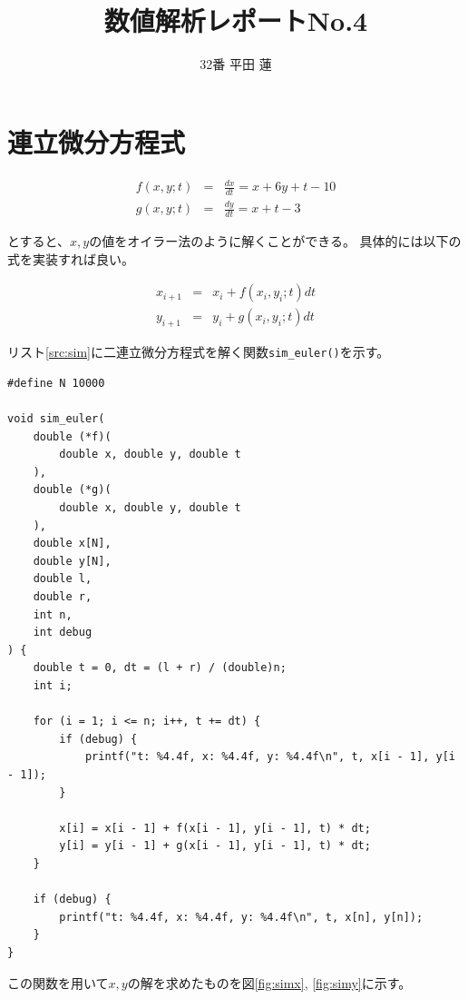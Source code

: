 \documentclass{jsarticle}
\title{数値解析レポートNo.4}
\author{32番 平田 蓮}
\date{}
\begin{document}
\maketitle
    \section{連立微分方程式}
        \begin{eqnarray}
            f(x, y; t) &=& \frac{dx}{dt} = x + 6y + t - 10 \nonumber \\
            g(x, y; t) &=& \frac{dy}{dt} = x + t - 3 \nonumber
        \end{eqnarray}

        とすると、$x, y$の値をオイラー法のように解くことができる。
        具体的には以下の式を実装すれば良い。

        \begin{eqnarray}
            x_{i + 1} &=& x_i + f(x_i, y_i; t)dt \nonumber \\
            y_{i + 1} &=& y_i + g(x_i, y_i; t)dt \nonumber
        \end{eqnarray}

        リスト\ref{src:sim}に二連立微分方程式を解く関数\verb|sim_euler()|を示す。

        \begin{lstlisting}[caption=sim\_euler.c, label=src:sim]
#define N 10000

void sim_euler(
    double (*f)(
        double x, double y, double t
    ),
    double (*g)(
        double x, double y, double t
    ),
    double x[N],
    double y[N],
    double l,
    double r,
    int n,
    int debug
) {
    double t = 0, dt = (l + r) / (double)n;
    int i;

    for (i = 1; i <= n; i++, t += dt) {
        if (debug) {
            printf("t: %4.4f, x: %4.4f, y: %4.4f\n", t, x[i - 1], y[i - 1]);
        }

        x[i] = x[i - 1] + f(x[i - 1], y[i - 1], t) * dt;
        y[i] = y[i - 1] + g(x[i - 1], y[i - 1], t) * dt;
    }

    if (debug) {
        printf("t: %4.4f, x: %4.4f, y: %4.4f\n", t, x[n], y[n]);
    }
}\end{lstlisting}

        この関数を用いて$x, y$の解を求めたものを図\ref{fig:simx}, \ref{fig:simy}に示す。
\end{document}

